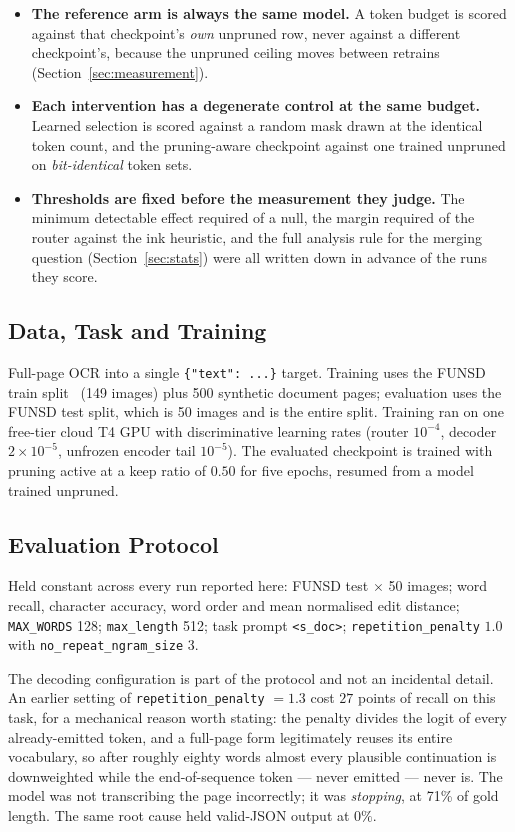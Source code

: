 \documentclass[conference]{IEEEtran}
\begin{document}
\begin{itemize}
\item \textbf{The reference arm is always the same model.} A token budget is scored against
that checkpoint's \emph{own} unpruned row, never against a different checkpoint's, because
the unpruned ceiling moves between retrains (Section~\ref{sec:measurement}).
\item \textbf{Each intervention has a degenerate control at the same budget.} Learned
selection is scored against a random mask drawn at the identical token count, and the
pruning-aware checkpoint against one trained unpruned on \emph{bit-identical} token sets.
\item \textbf{Thresholds are fixed before the measurement they judge.} The minimum detectable
effect required of a null, the margin required of the router against the ink heuristic, and
the full analysis rule for the merging question (Section~\ref{sec:stats}) were all written
down in advance of the runs they score.
\end{itemize}

\subsection{Data, Task and Training}

Full-page OCR into a single \texttt{\{"text": ...\}} target. Training uses the FUNSD
train split~\cite{funsd} (149 images) plus 500 synthetic document pages; evaluation uses the
FUNSD test split, which is 50 images and is the entire split. Training ran on one free-tier
cloud T4 GPU with discriminative learning rates (router $10^{-4}$, decoder
$2 \times 10^{-5}$, unfrozen encoder tail $10^{-5}$). The evaluated checkpoint is trained
with pruning active at a keep ratio of $0.50$ for five epochs, resumed from a model trained
unpruned.

\subsection{Evaluation Protocol}

Held constant across every run reported here: FUNSD test $\times$ 50 images; word recall,
character accuracy, word order and mean normalised edit distance; \texttt{MAX\_WORDS} 128;
\texttt{max\_length} 512; task prompt \texttt{<s\_doc>}; \texttt{repetition\_penalty} $1.0$
with \texttt{no\_repeat\_ngram\_size} 3.

The decoding configuration is part of the protocol and not an incidental detail. An earlier
setting of \texttt{repetition\_penalty} $=1.3$ cost $27$ points of recall on this task, for a
mechanical reason worth stating: the penalty divides the logit of every already-emitted
token, and a full-page form legitimately reuses its entire vocabulary, so after roughly
eighty words almost every plausible continuation is downweighted while the end-of-sequence
token --- never emitted --- never is. The model was not transcribing the page incorrectly; it
was \emph{stopping}, at 71\% of gold length. The same root cause held valid-JSON output at
$0\%$.
\end{document}
